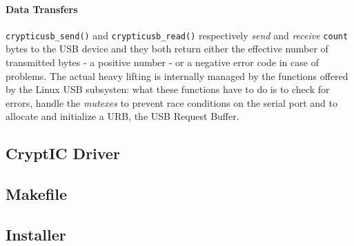 \paragraph{Data Transfers} \texttt{crypticusb\_send()} and \texttt{crypticusb\_read()} respectively \emph{send} and \emph{receive} \texttt{count} bytes to the USB device and they both return either the effective number of transmitted bytes - a positive number - or a negative error code in case of problems. The actual heavy lifting is internally managed by the functions offered by the Linux USB subsysten: what these functions have to do is to check for errors, handle the \textit{mutexes} to prevent race conditions on the serial port and to allocate and initialize a URB, the USB Request Buffer.

\subsection{CryptIC Driver}
\subsection{Makefile}
\subsection{Installer}

